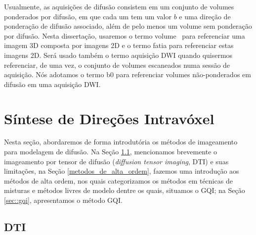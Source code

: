 \documentclass[
    12pt,                %
    oneside,            %
    a4paper,            %
    english,            %
    french,                %
    spanish,            %
    brazil                %
    ]{abntex2}
\begin{document}

Usualmente, as aquisições de difusão consistem em um conjunto de volumes ponderados por difusão, em que cada um tem um valor $b$ e uma direção de ponderação de difusão associado, além de pelo menos um volume sem ponderação por difusão. Nesta dissertação, usaremos o termo \textsf{volume} ~para referenciar uma imagem 3D composta por imagens 2D e o termo \textsf{fatia} para referenciar estas imagens 2D. Será usado também o termo \textsf{aquisição DWI} quando quisermos referenciar, de uma vez, o conjunto de volumes escaneados numa sessão de aquisição. Nós adotamos o termo \textsf{b0}  para referenciar volumes não-ponderados em difusão em uma aquisição DWI.

\section{Síntese de Direções Intravóxel}
\label{sec:sintese_intravoxels}

Nesta seção, abordaremos de forma introdutória os métodos de imageamento para modelagem de difusão. Na Seção \ref{sec::dti_limitacoes_hardi}, mencionamos brevemente o imageamento por tensor de difusão (\textit{diffusion tensor imaging}, DTI) e suas limitações, na Seção \ref{metodos_de_alta_ordem}, fazemos uma introdução aos métodos de alta ordem, nos quais categorizamos os métodos em técnicas de misturas e métodos livres de modelo dentre os quais, situamos o GQI; na Seção \ref{sec::gqi}, apresentamos o método GQI.

\subsection{DTI}
\label{sec::dti_limitacoes_hardi}
\end{document}
